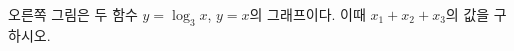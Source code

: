 \noindent\begin{minipage}[t]{0.58\linewidth}\vspace{0pt}\raggedright 오른쪽 그림은 두 함수 $y=\log_3 x$, $y=x$의 그래프이다. 이때 $x_1+x_2+x_3$의 값을 구하시오. \end{minipage}\hfill\begin{minipage}[t]{0.4\linewidth}\vspace{0pt}\centering \resizebox{\ifdim\width>\linewidth\linewidth\else\width\fi}{!}{}\end{minipage}\par
